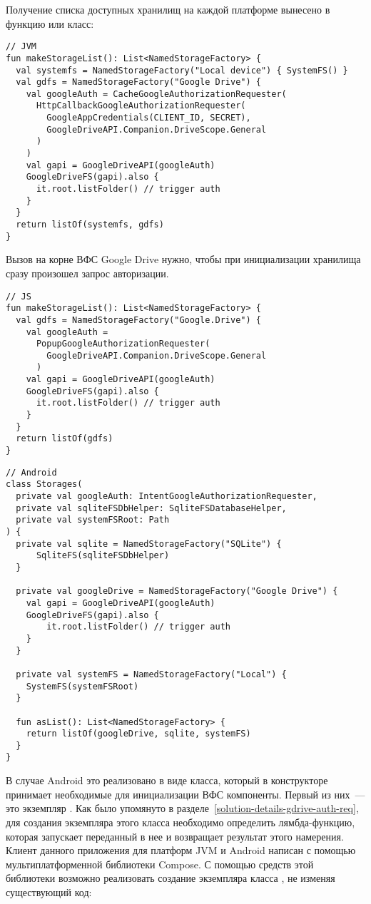     Получение списка доступных хранилищ на каждой платформе вынесено в функцию или класс:
    \begin{verbatim}
// JVM
fun makeStorageList(): List<NamedStorageFactory> {
  val systemfs = NamedStorageFactory("Local device") { SystemFS() }
  val gdfs = NamedStorageFactory("Google Drive") {
    val googleAuth = CacheGoogleAuthorizationRequester(
      HttpCallbackGoogleAuthorizationRequester(
        GoogleAppCredentials(CLIENT_ID, SECRET),
        GoogleDriveAPI.Companion.DriveScope.General
      )
    )
    val gapi = GoogleDriveAPI(googleAuth)
    GoogleDriveFS(gapi).also {
      it.root.listFolder() // trigger auth
    }
  }
  return listOf(systemfs, gdfs)
}
    \end{verbatim}
    Вызов  на корне ВФС Google Drive нужно, чтобы при инициализации хранилища сразу произошел запрос авторизации.
    \begin{verbatim}
// JS
fun makeStorageList(): List<NamedStorageFactory> {
  val gdfs = NamedStorageFactory("Google.Drive") {
    val googleAuth =
      PopupGoogleAuthorizationRequester(
        GoogleDriveAPI.Companion.DriveScope.General
      )
    val gapi = GoogleDriveAPI(googleAuth)
    GoogleDriveFS(gapi).also {
      it.root.listFolder() // trigger auth
    }
  }
  return listOf(gdfs)
}
    \end{verbatim}
    \begin{verbatim}
// Android
class Storages(
  private val googleAuth: IntentGoogleAuthorizationRequester,
  private val sqliteFSDbHelper: SqliteFSDatabaseHelper,
  private val systemFSRoot: Path
) {
  private val sqlite = NamedStorageFactory("SQLite") {
      SqliteFS(sqliteFSDbHelper)
  }

  private val googleDrive = NamedStorageFactory("Google Drive") {
    val gapi = GoogleDriveAPI(googleAuth)
    GoogleDriveFS(gapi).also {
        it.root.listFolder() // trigger auth
    }
  }

  private val systemFS = NamedStorageFactory("Local") {
    SystemFS(systemFSRoot)
  }

  fun asList(): List<NamedStorageFactory> {
    return listOf(googleDrive, sqlite, systemFS)
  }
}
    \end{verbatim}
    В случае Android это реализовано в виде класса, который в конструкторе принимает необходимые для инициализации ВФС компоненты. Первый из них~--- это экземпляр . Как было упомянуто в разделе~\ref{solution-details-gdrive-auth-req}, для создания экземпляра этого класса необходимо определить лямбда-функцию, которая запускает переданный в нее  и возвращает результат этого намерения. Клиент данного приложения для платформ JVM и Android написан с помощью мультиплатформенной библиотеки Compose\cite{gh-compose-jb}. С помощью средств этой библиотеки возможно реализовать создание экземпляра класса , не изменяя существующий код:
